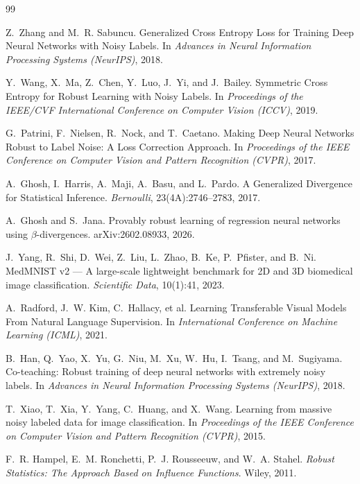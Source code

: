 \documentclass[11pt,a4paper]{article}
\begin{document}
\begin{thebibliography}{99}

Z.~Zhang and M.~R. Sabuncu.
\newblock Generalized Cross Entropy Loss for Training Deep Neural Networks with Noisy Labels.
\newblock In \emph{Advances in Neural Information Processing Systems (NeurIPS)}, 2018.

Y.~Wang, X.~Ma, Z.~Chen, Y.~Luo, J.~Yi, and J.~Bailey.
\newblock Symmetric Cross Entropy for Robust Learning with Noisy Labels.
\newblock In \emph{Proceedings of the IEEE/CVF International Conference on Computer Vision (ICCV)}, 2019.

G.~Patrini, F.~Nielsen, R.~Nock, and T.~Caetano.
\newblock Making Deep Neural Networks Robust to Label Noise: A Loss Correction Approach.
\newblock In \emph{Proceedings of the IEEE Conference on Computer Vision and Pattern Recognition (CVPR)}, 2017.

A.~Ghosh, I.~Harris, A.~Maji, A.~Basu, and L.~Pardo.
\newblock A Generalized Divergence for Statistical Inference.
\newblock \emph{Bernoulli}, 23(4A):2746--2783, 2017.

A.~Ghosh and S.~Jana.
\newblock Provably robust learning of regression neural networks using $\beta$-divergences.
\newblock arXiv:2602.08933, 2026.

J.~Yang, R.~Shi, D.~Wei, Z.~Liu, L.~Zhao, B.~Ke, P.~Pfister, and B.~Ni.
\newblock MedMNIST v2 --- A large-scale lightweight benchmark for 2D and 3D biomedical image classification.
\newblock \emph{Scientific Data}, 10(1):41, 2023.

A.~Radford, J.~W. Kim, C.~Hallacy, et al.
\newblock Learning Transferable Visual Models From Natural Language Supervision.
\newblock In \emph{International Conference on Machine Learning (ICML)}, 2021.

B.~Han, Q.~Yao, X.~Yu, G.~Niu, M.~Xu, W.~Hu, I.~Tsang, and M.~Sugiyama.
\newblock Co-teaching: Robust training of deep neural networks with extremely noisy labels.
\newblock In \emph{Advances in Neural Information Processing Systems (NeurIPS)}, 2018.

T.~Xiao, T.~Xia, Y.~Yang, C.~Huang, and X.~Wang.
\newblock Learning from massive noisy labeled data for image classification.
\newblock In \emph{Proceedings of the IEEE Conference on Computer Vision and Pattern Recognition (CVPR)}, 2015.

F.~R. Hampel, E.~M. Ronchetti, P.~J. Rousseeuw, and W.~A. Stahel.
\newblock \emph{Robust Statistics: The Approach Based on Influence Functions}.
\newblock Wiley, 2011.

\end{thebibliography}
\end{document}
